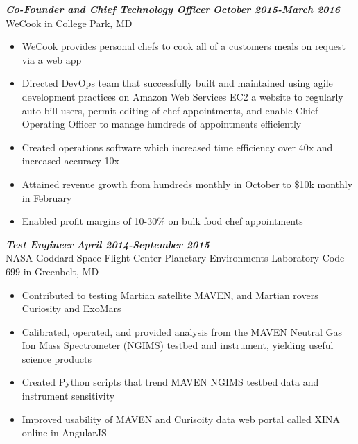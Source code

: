 \documentclass{res}
\begin{document}
\begin{resume}
	{\bfseries {\em Co-Founder and Chief Technology Officer}}  \hfill  {\bfseries{\em October 2015-March 2016}}\\
		WeCook in College Park, MD
                \begin{itemize}  \itemsep -2pt
		\item WeCook provides personal chefs to cook all of a customers meals on request via a web app
		\item Directed DevOps team that successfully built and maintained using agile development practices on Amazon Web Services EC2 a website to regularly auto bill users, permit editing of chef appointments, and enable Chief Operating Officer to manage hundreds of appointments efficiently
		\item Created operations software which increased time efficiency over 40x and increased accuracy 10x
		\item Attained revenue growth from hundreds monthly in October to \$10k monthly in February
		\item Enabled profit margins of 10-30\% on bulk food chef appointments
                \end{itemize}
                
	{\bfseries {\em Test Engineer}}  \hfill  {\bfseries{\em April 2014-September 2015}}\\
		NASA Goddard Space Flight Center Planetary Environments Laboratory Code 699 in Greenbelt, MD
                \begin{itemize}  \itemsep -2pt
                \item  Contributed to testing Martian satellite MAVEN, and Martian rovers Curiosity and ExoMars
		\item Calibrated, operated, and provided analysis from the MAVEN Neutral Gas Ion Mass Spectrometer (NGIMS) testbed and instrument, yielding useful science products
		\item Created Python scripts that trend MAVEN NGIMS testbed data and instrument sensitivity
		\item Improved usability of MAVEN and Curisoity data web portal called XINA online in AngularJS
                \end{itemize}


\end{resume}
\end{document}
